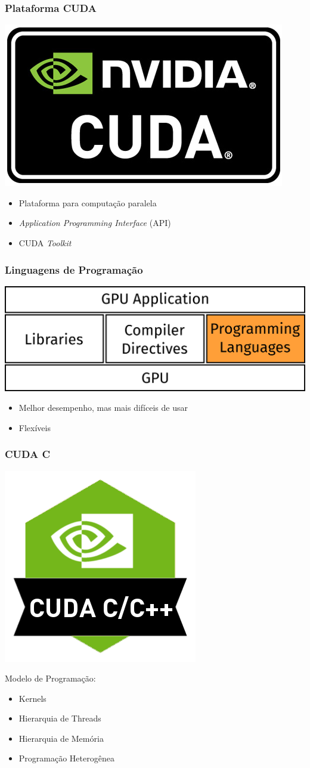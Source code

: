 \documentclass[10pt, compress]{beamer}
\begin{document}
\begin{frame}
    \frametitle{Plataforma CUDA}
    \begin{center}
        \includegraphics[width=.4\textwidth]{cuda-logo}
    \end{center}
    \begin{itemize}
        \item Plataforma para \alert{computação paralela}
        \item \textit{Application Programming Interface} (API)
        \item CUDA \textit{Toolkit}
    \end{itemize}
\end{frame}

\begin{frame}
    \frametitle{Linguagens de Programação}
    \begin{center}
        \includegraphics[width=.6\textwidth]{accel_apps_lang}
    \end{center}
    \begin{itemize}
        \item Melhor desempenho, mas mais difíceis de usar
        \item Flexíveis
    \end{itemize}
\end{frame}

\begin{frame}
    \frametitle{CUDA C}
    \begin{center}
        \includegraphics[width=.3\textwidth]{cuda-c}
    \end{center}
    Modelo de Programação:
    \begin{itemize}
        \item \alert{Kernels}
        \item Hierarquia de \alert{Threads}
        \item Hierarquia de \alert{Memória}
        \item Programação \alert{Heterogênea}
    \end{itemize}
\end{frame}
\end{document}
